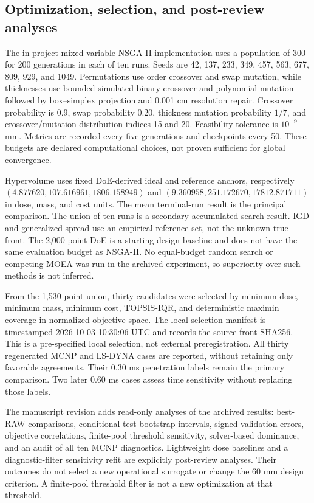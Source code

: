 \subsection{Optimization, selection, and post-review analyses}
The in-project mixed-variable NSGA-II implementation uses a population of 300 for 200 generations in each of ten runs. Seeds are 42, 137, 233, 349, 457, 563, 677, 809, 929, and 1049. Permutations use order crossover and swap mutation, while thicknesses use bounded simulated-binary crossover and polynomial mutation followed by box--simplex projection and 0.001 cm resolution repair. Crossover probability is 0.9, swap probability 0.20, thickness mutation probability $1/7$, and crossover/mutation distribution indices 15 and 20. Feasibility tolerance is $10^{-9}$ mm. Metrics are recorded every five generations and checkpoints every 50. These budgets are declared computational choices, not proven sufficient for global convergence.

Hypervolume uses fixed DoE-derived ideal and reference anchors, respectively $(4.877620,107.616961,1806.158949)$ and $(9.360958,251.172670,17812.871711)$ in dose, mass, and cost units. The mean terminal-run result is the principal comparison. The union of ten runs is a secondary accumulated-search result. IGD and generalized spread use an empirical reference set, not the unknown true front. The 2,000-point DoE is a starting-design baseline and does not have the same evaluation budget as NSGA-II. No equal-budget random search or competing MOEA was run in the archived experiment, so superiority over such methods is not inferred.

From the 1,530-point union, thirty candidates were selected by minimum dose, minimum mass, minimum cost, TOPSIS-IQR, and deterministic maximin coverage in normalized objective space. The local selection manifest is timestamped 2026-10-03 10:30:06 UTC and records the source-front SHA256. This is a pre-specified local selection, not external preregistration. All thirty regenerated MCNP and LS-DYNA cases are reported, without retaining only favorable agreements. Their 0.30 ms penetration labels remain the primary comparison. Two later 0.60 ms cases assess time sensitivity without replacing those labels.

The manuscript revision adds read-only analyses of the archived results: best-RAW comparisons, conditional test bootstrap intervals, signed validation errors, objective correlations, finite-pool threshold sensitivity, solver-based dominance, and an audit of all ten MCNP diagnostics. Lightweight dose baselines and a diagnostic-filter sensitivity refit are explicitly post-review analyses. Their outcomes do not select a new operational surrogate or change the 60 mm design criterion. A finite-pool threshold filter is not a new optimization at that threshold.

